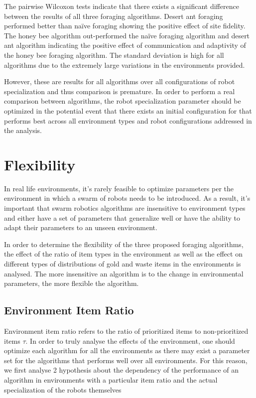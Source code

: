 The pairwise Wilcoxon tests indicate that there exists a significant difference between the results of all three foraging algorithms. Desert ant foraging performed better than na\"ive foraging showing the positive effect of site fidelity. The honey bee algorithm out-performed the na\"ive foraging algorithm and desert ant algorithm indicating the positive effect of communication and adaptivity of the honey bee foraging algorithm. The standard deviation is high for all algorithms due to the extremely large variations in the environments provided.

However, these are results for all algorithms over all configurations of robot specialization and thus comparison is premature. In order to perform a real comparison between algorithms, the robot specialization parameter \tau should be optimized in the potential event that there exists an initial configuration for \tau that performs best across all environment types and robot configurations addressed in the analysis. 



\section{Flexibility}
\label{results:flexibility}

In real life environments, it's rarely feasible to optimize parameters per the environment in which a swarm of robots needs to be introduced. As a result, it's important that swarm robotics algorithms are insensitive to environment types and either have a set of parameters that generalize well or have the ability to adapt their parameters to an unseen environment.

In order to determine the flexibility of the three proposed foraging algorithms, the effect of the ratio of item types in the environment as well as the effect on different types of distributions of gold and waste items in the environments is analysed. The more insensitive an algorithm is to the change in environmental parameters, the more flexible the algorithm. 

\subsection{Environment Item Ratio}
\label{results:ratio}

Environment item ratio refers to the ratio of prioritized items to non-prioritized items $\tau$. In order to truly analyse the effects of the environment, one should optimize each algorithm for all the environments as there may exist a parameter set for the algorithms that performs well over all environments. For this reason, we first analyse 2 hypothesis about the dependency of the performance of an algorithm in environments with a particular item ratio and the actual specialization of the robots themselves


